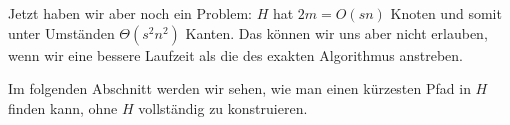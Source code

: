     Jetzt haben wir aber noch ein Problem: $H$ hat $2m = O(sn)$ Knoten und somit unter Umständen $\Theta(s^2n^2)$ Kanten. Das können wir uns aber nicht erlauben, wenn wir eine bessere Laufzeit als die des exakten Algorithmus anstreben.
%    
%    
%    	
%    	
%    	
    
    Im folgenden Abschnitt werden wir sehen, wie man einen kürzesten Pfad in $H$ finden kann, ohne $H$ vollständig zu konstruieren.
    
